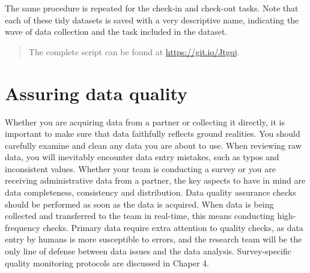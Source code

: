 \documentclass[
]{book}
\begin{document}
\begin{ex}
The same procedure is repeated for the check-in and check-out tasks. Note that each of these tidy datasets is saved with a very descriptive name, indicating the wave of data collection and the task included in the dataset.

\begin{quote}
The complete script can be found at \url{https://git.io/Jtgqj}.
\end{quote}
\end{ex}

\hypertarget{assuring-data-quality}{%
\section*{Assuring data quality}\label{assuring-data-quality}}

Whether you are acquiring data from a partner or collecting it directly,
it is important to make sure that data faithfully reflects ground realities.
You should carefully examine and clean any data you are about to use.
When reviewing raw data, you will inevitably encounter data entry mistakes,
such as typos and inconsistent values.
Whether your team is conducting a survey or
you are receiving administrative data from a partner,
the key aspects to have in mind are
data completeness, consistency and distribution.
Data quality assurance checks should be performed as soon as the data is acquired.
When data is being collected and transferred to the team in real-time,
this means conducting high-frequency checks.
Primary data require extra attention to quality checks,
as data entry by humans is more susceptible to errors,
and the research team will be the only line of defense between
data issues and the data analysis.
Survey-specific quality monitoring protocols are discussed in Chaper 4.
\end{document}
